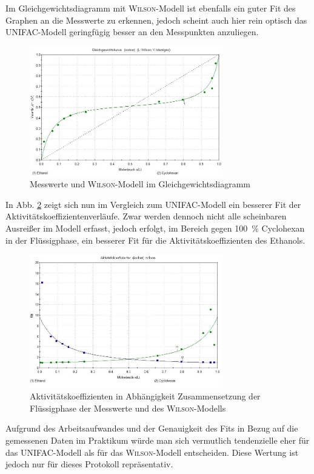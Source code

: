 Im Gleichgewichtsdiagramm mit \textsc{Wilson}-Modell ist ebenfalls ein guter Fit des Graphen an die Messwerte zu erkennen, jedoch scheint auch hier rein optisch das \textsc{UNIFAC}-Modell geringfügig besser an den Messpunkten anzuliegen.

\begin{figure}[h!]
	\centering
	\includegraphics[width=0.75\textwidth]{img/GGW_wilson}
	\caption{Messwerte und \textsc{Wilson}-Modell im Gleichgewichtsdiagramm}
	\label{fig:ggw_wilson}
\end{figure}
\FloatBarrier

In Abb. \ref{fig:gamma_wilson} zeigt sich nun im Vergleich zum \textsc{UNIFAC}-Modell ein besserer Fit der Aktivitätskoeffizientenverläufe. Zwar werden dennoch nicht alle scheinbaren Ausreißer im Modell erfasst, jedoch erfolgt, im Bereich gegen \SI{100}{\percent} Cyclohexan in der Flüssigphase, ein besserer Fit für die Aktivitätskoeffizienten des Ethanols.

\begin{figure}[h!]
	\centering
	\includegraphics[width=0.75\textwidth]{img/gamma_wilson}
	\caption{Aktivitätskoeffizienten in Abhängigkeit Zusammensetzung der Flüssigphase der Messwerte und des \textsc{Wilson}-Modells}
	\label{fig:gamma_wilson}
\end{figure}
\FloatBarrier

Aufgrund des Arbeitsaufwandes und der Genauigkeit des Fits in Bezug auf die gemessenen Daten im Praktikum würde man sich vermutlich tendenzielle eher für das \textsc{UNIFAC}-Modell als für das \textsc{Wilson}-Modell entscheiden. Diese Wertung ist jedoch nur für dieses Protokoll repräsentativ.